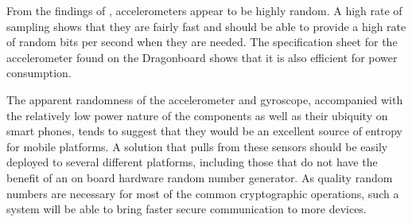 
From the findings of \cite{voris}, accelerometers appear to be highly random. A
high rate of sampling shows that they are fairly fast and should be able to
provide a high rate of random bits per second when they are needed. The
specification sheet for the accelerometer found on the Dragonboard shows that it
is also efficient for power consumption.

The apparent randomness of the accelerometer and gyroscope, accompanied with the
relatively low power nature of the components as well as their ubiquity on smart
phones, tends to suggest that they would be an excellent source of entropy for
mobile platforms. A solution that pulls from these sensors should be easily
deployed to several different platforms, including those that do not have the
benefit of an on board hardware random number generator. As quality random
numbers are necessary for most of the common cryptographic operations, such a
system will be able to bring faster secure communication to more devices. 
